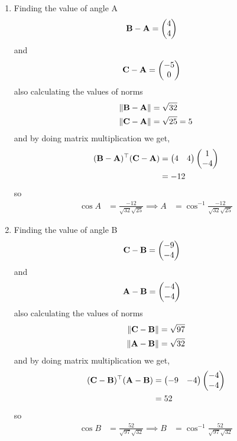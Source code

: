 \documentclass[11pt]{book}
\begin{document}
\begin{enumerate}[label=\thesection.\arabic*.,ref=\thesection.\theenumi]
\begin{enumerate}
\item Finding the value of angle A
\begin{align}
	\mathbf{B}-\mathbf{A} &=\begin{pmatrix}4\\4\end{pmatrix}
\end{align}
and 
\begin{align}
	\mathbf{C}-\mathbf{A}&= \begin{pmatrix}-5\\0\end{pmatrix}
\end{align}
also calculating the values of norms
\begin{align}
	\left\lVert\mathbf{B}-\mathbf{A}\right\rVert &= \sqrt{32} \\
	\left\lVert\mathbf{C}-\mathbf{A}\right\rVert &= \sqrt{25} = 5
\end{align}
and by doing matrix multiplication we get,
\begin{align}
\begin{split}
	(\mathbf{B}-\mathbf{A})^{\top}(\mathbf{C}-\mathbf{A})&=\begin{pmatrix}4&4\end{pmatrix}\begin{pmatrix}1\\-4\end{pmatrix}\\
	&=-12
\end{split}
\end{align}
so 
\begin{align}
	\cos{A}&= \frac{-12}{\sqrt{32} \sqrt{25}}
	\implies A&=\cos^{-1}{ \frac{-12}{\sqrt{32} \sqrt{25}}}
\end{align}




\item Finding the value of angle B
\begin{align}
	\mathbf{C}-\mathbf{B} &=\begin{pmatrix}-9\\-4\end{pmatrix}
\end{align}
and 
\begin{align}
	\mathbf{A}-\mathbf{B}&= \begin{pmatrix}-4\\-4\end{pmatrix}
\end{align}
also calculating the values of norms
\begin{align}
	\left\lVert\mathbf{C}-\mathbf{B}\right\rVert &= \sqrt{97}\\
	\left\lVert\mathbf{A}-\mathbf{B}\right\rVert &= \sqrt{32}
\end{align}
and by doing matrix multiplication we get,
\begin{align}
\begin{split}
	(\mathbf{C}-\mathbf{B})^{\top}(\mathbf{A}-\mathbf{B})&=\begin{pmatrix}-9&-4\end{pmatrix}\begin{pmatrix}-4\\-4\end{pmatrix}\\
	&= 52
\end{split}
\end{align}
so 
\begin{align}
	\cos{B}&= \frac{52}{\sqrt{97} \sqrt{32}}
	\implies B&=\cos^{-1}{ \frac{52}{\sqrt{97} \sqrt{32}}}
\end{align}




\end{enumerate}
\end{enumerate}
\end{document}
